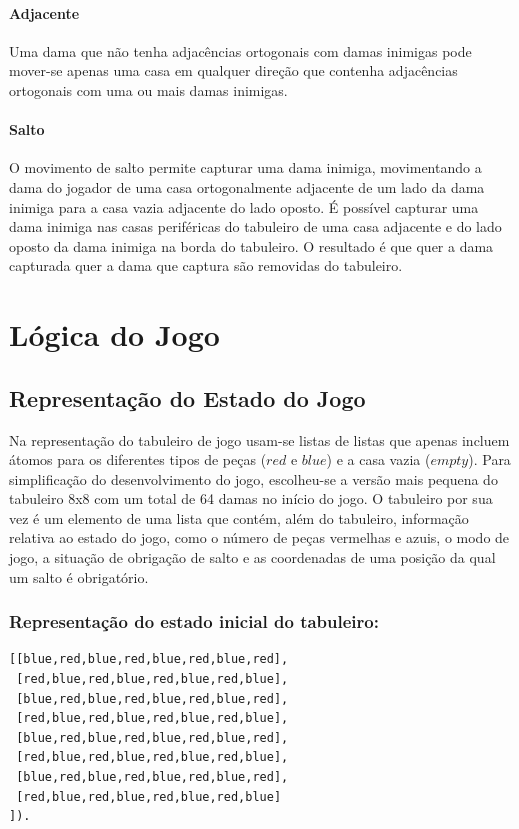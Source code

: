 \documentclass[a4paper]{article}
\begin{document}
\paragraph{Adjacente}
Uma dama que não tenha adjacências ortogonais com damas inimigas pode mover-se apenas uma casa em qualquer direção que contenha adjacências ortogonais com uma ou mais damas inimigas.

\paragraph{Salto}
O movimento de salto permite capturar uma dama inimiga, movimentando a dama do jogador de uma casa ortogonalmente adjacente de um lado da dama inimiga para a casa vazia adjacente do lado oposto. É possível capturar uma dama inimiga nas casas periféricas do tabuleiro de uma casa adjacente e do lado oposto da dama inimiga na borda do tabuleiro. O resultado é que quer a dama capturada quer a dama que captura são removidas do tabuleiro.


\section{Lógica do Jogo}

\subsection{Representação do Estado do Jogo} 
Na representação do tabuleiro de jogo usam-se listas de listas que apenas incluem
átomos para os diferentes tipos de peças ($red$ e $blue$) e a casa vazia ($empty$). Para simplificação do desenvolvimento do jogo, escolheu-se a versão mais pequena do tabuleiro 8x8 com um total de 64 damas no início do jogo. O tabuleiro por sua vez é um elemento de uma lista que contém, além do tabuleiro, informação relativa ao estado do jogo, como o número de peças vermelhas e azuis, o modo de jogo, a situação de obrigação de salto e as coordenadas de uma posição da qual um salto é obrigatório.
 
\subsubsection{Representação do estado inicial do tabuleiro:}
\begin{verbatim}
[[blue,red,blue,red,blue,red,blue,red],
 [red,blue,red,blue,red,blue,red,blue],
 [blue,red,blue,red,blue,red,blue,red],
 [red,blue,red,blue,red,blue,red,blue],
 [blue,red,blue,red,blue,red,blue,red],
 [red,blue,red,blue,red,blue,red,blue],
 [blue,red,blue,red,blue,red,blue,red],
 [red,blue,red,blue,red,blue,red,blue]
]).
\end{verbatim}
\end{document}
